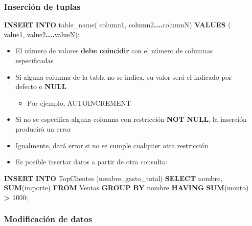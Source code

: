 \documentclass[
]{book}
\newenvironment{Shaded}{\begin{snugshade}}{\end{snugshade}}
\newcommand{\DecValTok}[1]{\textcolor[rgb]{0.00,0.00,0.81}{#1}}
\newcommand{\FunctionTok}[1]{\textcolor[rgb]{0.13,0.29,0.53}{\textbf{#1}}}
\newcommand{\KeywordTok}[1]{\textcolor[rgb]{0.13,0.29,0.53}{\textbf{#1}}}
\newcommand{\NormalTok}[1]{#1}
\newcommand{\OperatorTok}[1]{\textcolor[rgb]{0.81,0.36,0.00}{\textbf{#1}}}
\providecommand{\tightlist}{%
  \setlength{\itemsep}{0pt}\setlength{\parskip}{0pt}}
\theoremstyle{break}
\theoremstyle{nonumberplain}
\begin{document}
\subsubsection{Inserción de tuplas}\label{inserciuxf3n-de-tuplas}

\begin{Shaded}
\begin{Highlighting}[]
\KeywordTok{INSERT} \KeywordTok{INTO}\NormalTok{ table\_name( column1, column2}\OperatorTok{....}\NormalTok{columnN)}
\KeywordTok{VALUES}\NormalTok{ ( value1, value2}\OperatorTok{....}\NormalTok{valueN);}
\end{Highlighting}
\end{Shaded}

\begin{itemize}
\item
  El número de valores \textbf{debe coincidir} con el número de columnas especificadas
\item
  Si alguna columna de la tabla no se indica, su valor será el indicado por defecto o \textbf{NULL}

  \begin{itemize}
  \tightlist
  \item
    Por ejemplo, AUTOINCREMENT
  \end{itemize}
\item
  Si no se especifica alguna columna con restricción \textbf{NOT NULL}, la inserción producirá un error
\item
  Igualmente, dará error si no se cumple cualquier otra restricción
\item
  Es posible insertar datos a partir de otra consulta:
\end{itemize}

\begin{Shaded}
\begin{Highlighting}[]
\KeywordTok{INSERT} \KeywordTok{INTO}\NormalTok{ TopClientes (nombre, gasto\_total)}
  \KeywordTok{SELECT}\NormalTok{ nombre, }\FunctionTok{SUM}\NormalTok{(importe)}
  \KeywordTok{FROM}\NormalTok{ Ventas}
  \KeywordTok{GROUP} \KeywordTok{BY}\NormalTok{ nombre}
  \KeywordTok{HAVING} \FunctionTok{SUM}\NormalTok{(monto) }\OperatorTok{\textgreater{}} \DecValTok{1000}\NormalTok{;}
\end{Highlighting}
\end{Shaded}

\subsubsection{Modificación de datos}\label{modificaciuxf3n-de-datos}
\end{document}
